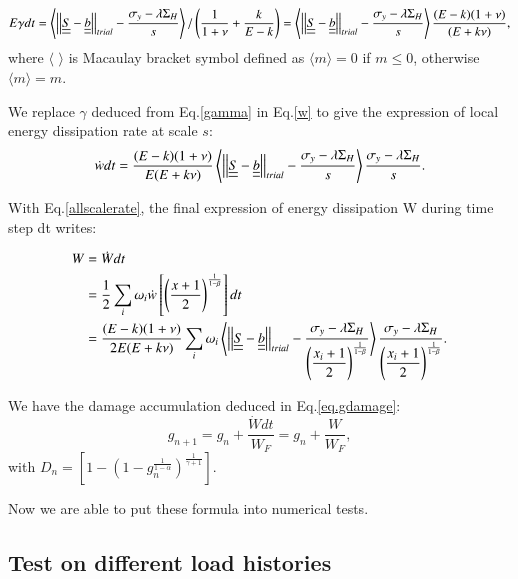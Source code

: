 \documentclass[3p,times,procedia,number]{elsarticle}
\begin{document}
\begin{equation}E\gamma dt=\left\langle \left| \left|\uline{\uline{S}}-\uline{\uline{b}}\right| \right|_{trial}-\dfrac{\sigma_y-\lambda \Sigma_H}{s}\right\rangle /\left(\dfrac{1}{1+\nu}+\dfrac{k}{E-k} \right)=\left\langle \left| \left|\uline{\uline{S}}-\uline{\uline{b}}\right| \right|_{trial}-\dfrac{\sigma_y-\lambda \Sigma_H}{s}\right\rangle\dfrac{(E-k)(1+\nu) }{(E+k\nu)},
	\label{gamma}
\end{equation}
where $\langle$ $\rangle$ is Macaulay bracket symbol defined as $\langle m\rangle=0$ if $m\leqslant0$, otherwise $\langle m\rangle=m$.

We replace $\gamma$ deduced from Eq.\eqref{gamma} in Eq.\eqref{w} to give the expression of local energy dissipation rate at scale $s$:
\begin{equation}
	\dot{w}dt=\dfrac{(E-k)(1+\nu) }{E(E+k\nu)}\left\langle  \left| \left|\uline{\uline{S}}-\uline{\uline{b}}\right| \right|_{trial}-\dfrac{\sigma_y-\lambda \Sigma_H}{s}\right\rangle \dfrac{\sigma_y-\lambda \Sigma_H}{s}.
	\label{dW}
\end{equation}

With Eq.\eqref{allscalerate}, the final expression of energy dissipation W during time step dt writes:

\begin{equation}
	\begin{split}
		W&=\dot{W}dt
		\\&=\frac{1}{2}\sum_{i}\omega_i\dot{w}\left[  \left( \frac{x+1}{2}\right) ^{\frac{1}{1-\beta}}\right]dt
		\\&=\dfrac{(E-k)(1+\nu) }{2E(E+k\nu)}\sum_{i}\omega_i\left\langle  \left| \left|\uline{\uline{S}}-\uline{\uline{b}}\right| \right|_{trial}-\dfrac{\sigma_y-\lambda \Sigma_H}{\left( \dfrac{x_i+1}{2}\right) ^{\frac{1}{1-\beta}}}\right\rangle \dfrac{\sigma_y-\lambda \Sigma_H}{\left( \dfrac{x_i+1}{2}\right) ^{\frac{1}{1-\beta}}}.
	\end{split}
	\label{finaldw}
\end{equation}


We have the damage accumulation deduced in Eq.\eqref{eq.gdamage}:
$$g_{n+1}=g_n+\dfrac{\dot{W}dt}{W_F}=g_n+\dfrac{W}{W_F},$$
with $D_n=\left[1-\left(1-g_n^{\frac{1}{1-\alpha}} \right)^{\frac{1}{\gamma+1}}  \right]. $

Now we are able to put these formula into numerical tests.

\subsection{Test on different load histories}
\end{document}
